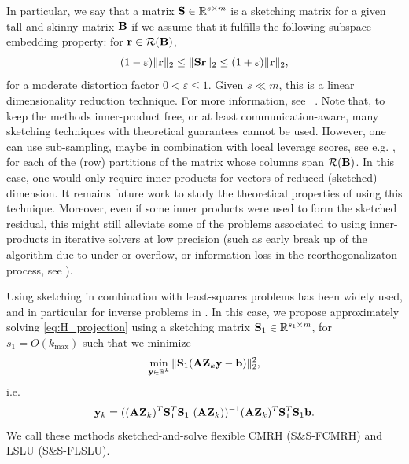 \documentclass[11pt]{article}
\numberwithin{equation}{section}
\newcommand{\eps} {\varepsilon}                            %
\newcommand{\bfA}{{\bf A}}
\newcommand{\bfB}{{\bf B}}
\newcommand{\bfQ}{{\bf Q}}
\newcommand{\bfR}{{\bf R}}
\newcommand{\bfS}{{\bf S}}
\newcommand{\bfZ}{{\bf Z}}
\newcommand{\bfb}{{\bf b}}
\newcommand{\bfr}{{\bf r}}
\newcommand{\bfy}{{\bf y}}
\begin{document}
In particular, we say that a matrix $\bfS \in \mathbb{R}^{s\times m}$ is a sketching matrix for a given tall and skinny matrix $\bfB$ if we assume that it fulfills the following subspace embedding property: for $\bfr \in \mathcal{R}(\bfB)$,
\[(1-\eps)\|\bfr\|_2\leq\|\bfS\bfr\|_2\leq (1+\eps)\|\bfr\|_2,\]
for a moderate distortion factor $0<\eps\leq1$. Given $s \ll m$, this is a linear dimensionality reduction technique. For more information, see ~\cite[\S~8.1]{Martinsson_Tropp_2020}. Note that, to keep the methods inner-product free, or at least communication-aware, many sketching techniques with theoretical guarantees cannot be used. However, one can use sub-sampling, maybe in combination with local leverage scores, see e.g. \cite{Kolda2022sampling}, for each of the (row) partitions of the matrix whose columns span $\mathcal{R}(\bfB)$. In this case, one would only require inner-products for vectors of reduced (sketched) dimension. It remains future work to study the theoretical properties of using this technique. Moreover, even if some inner products were used to form the sketched residual, this might still alleviate some of the problems associated to using inner-products in iterative solvers at low precision (such as early break up of the algorithm due to under or overflow, or information loss in the reorthogonalizaton process, see \cite{brown2024hcmrh}).

Using sketching in combination with least-squares problems has been widely used, and in particular for inverse problems in \cite{Sabate2025randCMRH,chung2025randomized,Sabate2025rand}. In this case, we propose  approximately solving \eqref{eq:H_projection} using a sketching matrix $\bfS_1\in\mathbb{R}^{s_1\times m}$, for $s_1=O(k_{\text{max}})$ such that we minimize
\begin{equation}\label{eq:H_sketched_projection}
   \min_{\bfy\in\mathbb{R}^k} \| \bfS_1 (\bfA \bfZ_k\bfy -\bfb)\|_2^2, %
\end{equation}
i.e.
\[
\bfy_k = ((\bfA \bfZ_k)^T{\bfS}_1^T \bfS_1\ (\bfA \bfZ_k))^{-1} (\bfA \bfZ_k)^T\bfS_1^T \bfS_1 \bfb.
\]
We call these methods sketched-and-solve flexible CMRH (S\&S-FCMRH) and LSLU (S\&S-FLSLU).
\end{document}
